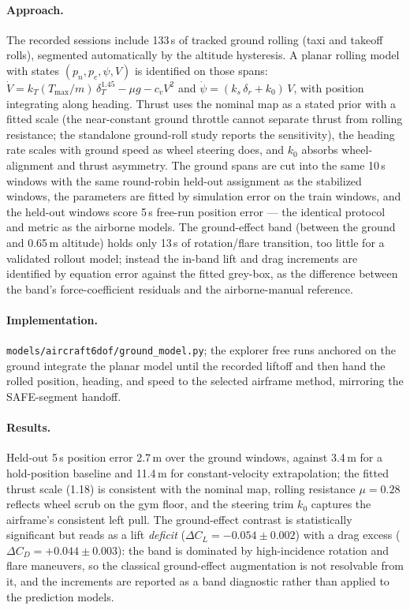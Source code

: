 \documentclass[11pt]{article}
\begin{document}
\paragraph{Approach.} The recorded sessions include 133\,s of tracked
ground rolling (taxi and takeoff rolls), segmented automatically by the
altitude hysteresis. A planar rolling model with states
$(p_n,p_e,\psi,V)$ is identified on those spans:
$\dot V = k_T (T_{\max}/m)\,\delta_T^{1.45} - \mu g - c_v V^2$ and
$\dot\psi = (k_s\,\delta_r + k_0)\,V$, with position integrating along
heading. Thrust uses the nominal map as a stated prior with a fitted scale
(the near-constant ground throttle cannot separate thrust from rolling
resistance; the standalone ground-roll study reports the sensitivity), the
heading rate scales with ground speed as wheel steering does, and $k_0$
absorbs wheel-alignment and thrust asymmetry. The ground spans are cut into
the same 10\,s windows with the same round-robin held-out assignment as the
stabilized windows, the parameters are fitted by simulation error on the
train windows, and the held-out windows score 5\,s free-run position error
--- the identical protocol and metric as the airborne models. The
ground-effect band (between the ground and 0.65\,m altitude) holds only
13\,s of rotation/flare transition, too little for a validated rollout
model; instead the in-band lift and drag increments are identified by
equation error against the fitted grey-box, as the difference between the
band's force-coefficient residuals and the airborne-manual reference.
\paragraph{Implementation.}
\texttt{models/aircraft6dof/ground\_model.py}; the explorer free runs
anchored on the ground integrate the planar model until the recorded
liftoff and then hand the rolled position, heading, and speed to the
selected airframe method, mirroring the SAFE-segment handoff.
\paragraph{Results.} Held-out 5\,s position error 2.7\,m over the ground
windows, against 3.4\,m for a hold-position baseline and 11.4\,m for
constant-velocity extrapolation; the fitted thrust scale (1.18) is
consistent with the nominal map, rolling resistance $\mu=0.28$ reflects
wheel scrub on the gym floor, and the steering trim $k_0$ captures the
airframe's consistent left pull. The ground-effect contrast is
statistically significant but reads as a lift \emph{deficit}
($\Delta C_L=-0.054\pm0.002$) with a drag excess
($\Delta C_D=+0.044\pm0.003$): the band is dominated by high-incidence
rotation and flare maneuvers, so the classical ground-effect augmentation
is not resolvable from it, and the increments are reported as a band
diagnostic rather than applied to the prediction models.
\end{document}
